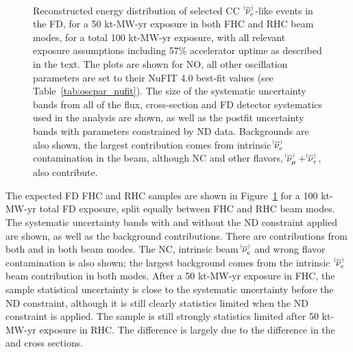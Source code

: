 \begin{figure}[htbp]
 \\
 \caption{Reconstructed energy distribution of selected CC $\;\nue^{\bracketbar}$-like events in the FD, for a 50 kt-MW-yr exposure in both FHC and RHC beam modes, for a total 100 kt-MW-yr exposure, with all relevant exposure assumptions including 57\% accelerator uptime as described in the text. The plots are shown for NO, all other oscillation parameters are set to their NuFIT 4.0 best-fit values (see Table~\ref{tab:oscpar_nufit}). The size of the systematic uncertainty bands from all of the flux, cross-section and FD detector systematics used in the analysis are shown, as well as the postfit uncertainty bands with parameters constrained by ND data. Backgrounds are also shown, the largest contribution comes from intrinsic $\nue^{\bracketbar}$ contamination in the beam, although NC and other flavors, $\numu^{\bracketbar} + \nutau^{\bracketbar}$, also contribute.}
 \label{fig:appspectra}
\end{figure}
The expected FD FHC \nue and RHC \anue samples are shown in Figure~\ref{fig:appspectra} for a 100 kt-MW-yr total FD exposure, split equally between FHC and RHC beam modes. The systematic uncertainty bands with and without the ND constraint applied are shown, as well as the background contributions. There are contributions from both \nue and \anue in both beam modes. The NC, intrinsic beam $\nue^{\bracketbar}$ and wrong flavor contamination is also shown; the largest background comes from the intrinsic $\;\nue^{\bracketbar}$ beam contribution in both modes. After a 50 kt-MW-yr exposure in FHC, the \nue sample statistical uncertainty is close to the systematic uncertainty before the ND constraint, although it is still clearly statistics limited when the ND constraint is applied. The \anue sample is still strongly statistics limited after 50 kt-MW-yr exposure in RHC. The difference is largely due to the difference in the \nue and \anue cross sections. %

